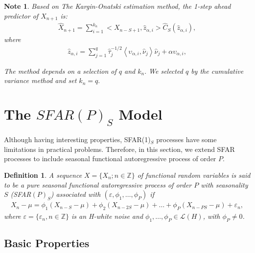 \documentclass[11pt,a4paper]{article}
\newtheorem{definition} {Definition}[section]
\newtheorem{Note}{Note}[section]
\numberwithin{equation}{section}
\begin{document}
\begin{Note}
  Based on The Kargin-Onatski estimation method, the 1-step ahead predictor of $X_{n+1}$ is:
  \begin{align}
        \hat{X}_{n+1}=\sum_{i=1}^{k_n}<X_{n-S+1},\hat{z}_{\alpha,i}>    \hat{C}_{S}(\hat{z}_{\alpha,i}),
  \end{align}
  where
  \begin{align}
      \hat{z}_{\alpha,i}=\sum_{j=1}^{q}\hat{\tau}_{j}^{-1/2}\left  \langle{\upsilon}_{\alpha,i},\hat\nu_{j}
      \right\rangle\hat{\nu}_{j}+\alpha{\upsilon}_{\alpha,i},
\end{align}

The method depends on a selection of $q$ and $k_n.$ We selected $q$ by the cumulative variance method and set $k_n=q.$
\end{Note}


\section[The SFAR(P)s Model]{The $SFAR(P)_{S}$ Model}\label{sec:SFARp}

Although having interesting properties, SFAR(1)$_S$ processes have some limitations in practical problems. Therefore, in this section, we extend SFAR processes to include seasonal functional autoregressive process of order $P$.

\begin{definition}
  A sequence $X=\{X_{n};n\in\mathbb{Z}\}$ of functional random variables is said to be a pure seasonal functional autoregressive process of order $P$ with seasonality $S$ (SFAR$(P)_{S}$) associated with $(\varepsilon,\phi_{1},\dots,\phi_{P})$ if
  \begin{align}\label{eq-sarhp}
    X_{n}-\mu=\phi_{1}\left(X_{n-S}-\mu\right)+\phi_{2}\left(X_{n-2S}-\mu\right)+\dots+\phi_{P}\left(X_{n-PS}-\mu\right)+\varepsilon_{n},
  \end{align}
  where $\varepsilon=\{\varepsilon_{n}, n\in\mathbb{Z}\}$ is an H-white noise and $\phi_{1},\dots,\phi_{P}\in\mathcal{L}(H)$, with $\phi_{P}\neq 0$.
\end{definition}

\subsection{Basic Properties}
\end{document}

